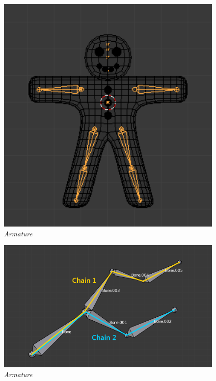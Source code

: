 \setcounter{section}{1}
\begin{figure}[ht]
    \centering
    \includegraphics[width=1.0\textwidth]{resources/chapter-2-basic-armature.png}
    \caption{\textit{Armature} \parencite{blender-armature-structure}}
    \label{fig:basic-armature}
\end{figure}

\begin{figure}[ht]
    \centering
    \includegraphics[width=1.0\textwidth]{resources/chapter-2-chain-of-bones.png}
    \caption{\textit{Armature} \parencite{blender-armature-structure}}
    \label{fig:chains-of-bones}
\end{figure}

